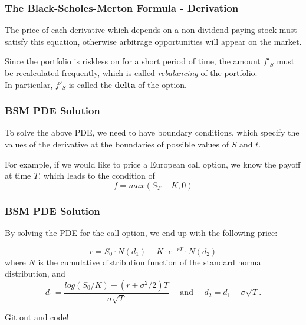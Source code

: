 \documentclass[ignorenonframetext, 9pt]{beamer}
\begin{document}
\begin{frame}
\frametitle{The Black-Scholes-Merton Formula - Derivation}


The price of each derivative which depends on a non-dividend-paying stock must satisfy this equation, otherwise arbitrage opportunities will appear on the market. \newline

\pause

Since the portfolio is riskless on for a short period of time, the amount $f'_S$ must be recalculated frequently, which is called \textit{rebalancing} of the portfolio.\\

In particular, $f'_S$ is called the \textbf{delta} of the option.
\end{frame}



\begin{frame}
\frametitle{BSM PDE Solution}

To solve the above PDE, we need to have boundary conditions, which specify the values of the derivative at the boundaries of possible values of $S$ and $t$. \newline

\pause

For example, if we would like to price a European call option, we know the payoff at time $T$, which leads to the condition of
\begin{equation}
f = max(S_T - K, 0)
\end{equation} \newline

\end{frame}

\begin{frame}
\frametitle{BSM PDE Solution}

By solving the PDE for the call option, we end up with the following price:

\begin{equation}
c = S_0 \cdot N(d_1) - K\cdot e^{-rT} \cdot N(d_2)
\end{equation}
where $N$ is the cumulative distribution function of the standard normal distribution, and
\begin{equation*}
d_1 = \frac{log(S_0 / K) + (r + \sigma^2 / 2)T}{\sigma\sqrt{T}}  \quad \text{ and } \quad d_2 = d_1 - \sigma\sqrt{T}.
\end{equation*}

\pause

\vfill
\begin{tcolorbox}[text width=\textwidth/4, boxrule=3pt, colback=mygreen!5!white, colframe=mygreen!75!black]
\textcolor{mygreen!50!black}{Git out and code!}
\end{tcolorbox}

\end{frame}
\end{document}
